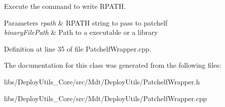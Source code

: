 Execute the command to write R\+P\+A\+TH. 


\begin{DoxyParams}{Parameters}
{\em rpath} & R\+P\+A\+TH string to pass to patchelf \\
\hline
{\em binary\+File\+Path} & Path to a executable or a library \\
\hline
\end{DoxyParams}


Definition at line 35 of file Patchelf\+Wrapper.\+cpp.



The documentation for this class was generated from the following files\+:\begin{DoxyCompactItemize}
\item 
libs/\+Deploy\+Utils\+\_\+\+Core/src/\+Mdt/\+Deploy\+Utils/Patchelf\+Wrapper.\+h\item 
libs/\+Deploy\+Utils\+\_\+\+Core/src/\+Mdt/\+Deploy\+Utils/Patchelf\+Wrapper.\+cpp\end{DoxyCompactItemize}
